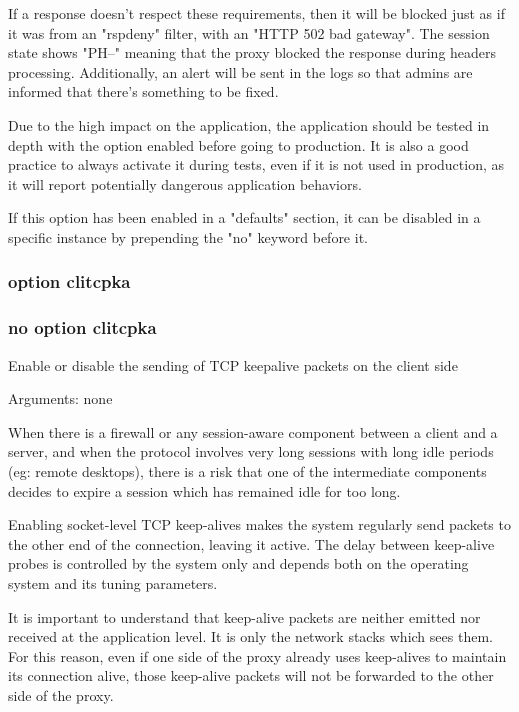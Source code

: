   If a response doesn't respect these requirements, then it will be blocked
  just as if it was from an "rspdeny" filter, with an "HTTP 502 bad gateway".
  The session state shows "PH--" meaning that the proxy blocked the response
  during headers processing. Additionally, an alert will be sent in the logs so
  that admins are informed that there's something to be fixed.

  Due to the high impact on the application, the application should be tested
  in depth with the option enabled before going to production. It is also a
  good practice to always activate it during tests, even if it is not used in
  production, as it will report potentially dangerous application behaviors.

  If this option has been enabled in a "defaults" section, it can be disabled
  in a specific instance by prepending the "no" keyword before it.

\subsubsection{option clitcpka}
\subsubsection{no option clitcpka}


  Enable or disable the sending of TCP keepalive packets on the client side

                                 
  Arguments: none

  When there is a firewall or any session-aware component between a client and
  a server, and when the protocol involves very long sessions with long idle
  periods (eg: remote desktops), there is a risk that one of the intermediate
  components decides to expire a session which has remained idle for too long.

  Enabling socket-level TCP keep-alives makes the system regularly send packets
  to the other end of the connection, leaving it active. The delay between
  keep-alive probes is controlled by the system only and depends both on the
  operating system and its tuning parameters.

  It is important to understand that keep-alive packets are neither emitted nor
  received at the application level. It is only the network stacks which sees
  them. For this reason, even if one side of the proxy already uses keep-alives
  to maintain its connection alive, those keep-alive packets will not be
  forwarded to the other side of the proxy.

